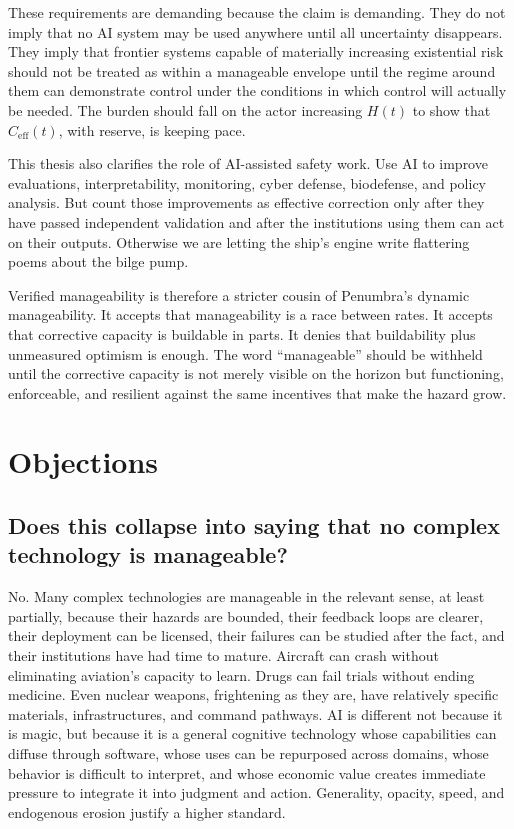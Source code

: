 \documentclass[11pt]{article}
\begin{document}
These requirements are demanding because the claim is demanding. They do not imply that no AI system may be used anywhere until all uncertainty disappears. They imply that frontier systems capable of materially increasing existential risk should not be treated as within a manageable envelope until the regime around them can demonstrate control under the conditions in which control will actually be needed. The burden should fall on the actor increasing $H(t)$ to show that $C_{\mathrm{eff}}(t)$, with reserve, is keeping pace.

This thesis also clarifies the role of AI-assisted safety work. Use AI to improve evaluations, interpretability, monitoring, cyber defense, biodefense, and policy analysis. But count those improvements as effective correction only after they have passed independent validation and after the institutions using them can act on their outputs. Otherwise we are letting the ship's engine write flattering poems about the bilge pump.

Verified manageability is therefore a stricter cousin of Penumbra's dynamic manageability. It accepts that manageability is a race between rates. It accepts that corrective capacity is buildable in parts. It denies that buildability plus unmeasured optimism is enough. The word ``manageable'' should be withheld until the corrective capacity is not merely visible on the horizon but functioning, enforceable, and resilient against the same incentives that make the hazard grow.

\section{Objections}
\label{sec:objections}

\subsection{Does this collapse into saying that no complex technology is manageable?}

No. Many complex technologies are manageable in the relevant sense, at least partially, because their hazards are bounded, their feedback loops are clearer, their deployment can be licensed, their failures can be studied after the fact, and their institutions have had time to mature. Aircraft can crash without eliminating aviation's capacity to learn. Drugs can fail trials without ending medicine. Even nuclear weapons, frightening as they are, have relatively specific materials, infrastructures, and command pathways. AI is different not because it is magic, but because it is a general cognitive technology whose capabilities can diffuse through software, whose uses can be repurposed across domains, whose behavior is difficult to interpret, and whose economic value creates immediate pressure to integrate it into judgment and action. Generality, opacity, speed, and endogenous erosion justify a higher standard.
\end{document}
